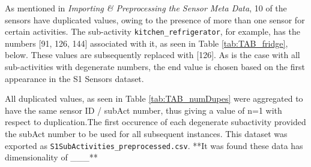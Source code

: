\documentclass[11pt,]{article}
\begin{document}
As mentioned in \emph{Importing \& Preprocessing the Sensor Meta Data},
10 of the sensors have duplicated values, owing to the presence of more
than one sensor for certain activities. The sub-activity
\texttt{kitchen\_refrigerator}, for example, has the numbers {[}91, 126,
144{]} associated with it, as seen in Table \ref{tab:TAB_fridge}, below.
These values are subsequently replaced with {[}126{]}. As is the case
with all sub-activities with degenerate numbers, the end value is chosen
based on the first appearance in the S1 Sensors dataset.

All duplicated values, as seen in Table \ref{tab:TAB_numDupes} were
aggregated to have the same sensor ID / subAct number, thus giving a
value of n=1 with respect to duplication.The first occurence of each
degenerate subactivity provided the subAct number to be used for all
subsequent instances. This dataset was exported as
\texttt{S1SubActivities\_preprocessed.csv}. **It was found these data
has dimensionality of \_\_\_**

\begin{table}[!h]

\caption{\label{tab:TAB_fridge}Example of duplicate sub-activity number removal}
\centering
{}
\end{table}
\end{document}
